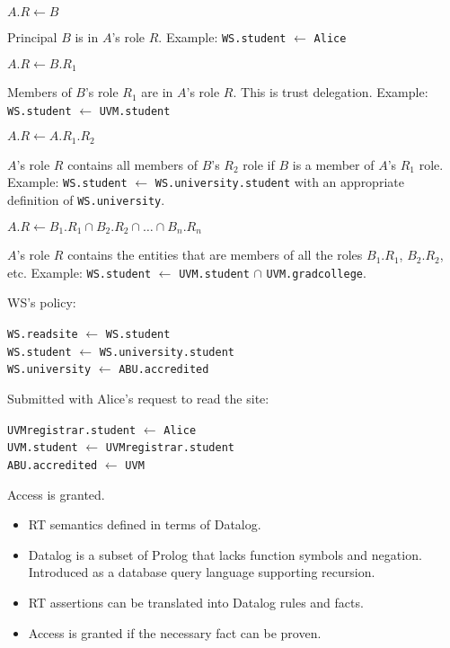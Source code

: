 \documentclass[landscape]{slides}
\begin{document}
\stopslide



$A.R \leftarrow B$

Principal $B$ is in $A$'s role $R$. Example: \texttt{WS.student} $\leftarrow$ \texttt{Alice}

$A.R \leftarrow B.R_1$

Members of $B$'s role $R_1$ are in $A$'s role $R$. This is trust delegation. Example: \texttt{WS.student} $\leftarrow$ \texttt{UVM.student}

\stopslide



$A.R \leftarrow A.R_1.R_2$

$A$'s role $R$ contains all members of $B$'s $R_2$ role if $B$ is a member of $A$'s $R_1$ role. Example: \texttt{WS.student} $\leftarrow$ \texttt{WS.university.student} with an appropriate definition of \texttt{WS.university}.

$A.R \leftarrow B_1.R_1 \cap B_2.R_2 \cap \ldots \cap B_n.R_n$

$A$'s role $R$ contains the entities that are members of all the roles $B_1.R_1$, $B_2.R_2$, etc. Example: \texttt{WS.student} $\leftarrow$ \texttt{UVM.student} $\cap$ \texttt{UVM.gradcollege}.

\stopslide



WS's policy:

\texttt{WS.readsite} $\leftarrow$ \texttt{WS.student}\\
\texttt{WS.student} $\leftarrow$ \texttt{WS.university.student}\\
\texttt{WS.university} $\leftarrow$ \texttt{ABU.accredited}

Submitted with Alice's request to read the site:

\texttt{UVMregistrar.student} $\leftarrow$ \texttt{Alice}\\
\texttt{UVM.student} $\leftarrow$ \texttt{UVMregistrar.student}\\
\texttt{ABU.accredited} $\leftarrow$ \texttt{UVM}

Access is granted.

\stopslide


\begin{itemize}

\item RT semantics defined in terms of Datalog.

\item Datalog is a subset of Prolog that lacks function symbols and negation. Introduced as a database query language supporting recursion.

\item RT assertions can be translated into Datalog rules and facts.

\item Access is granted if the necessary fact can be proven.

\end{itemize}
\end{document}
